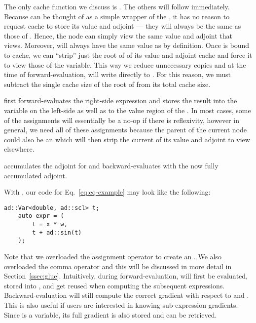 The only cache function we discuss is .
The others will follow immediately.
Because  can be thought of as a simple wrapper of the ,
it has no reason to request cache to store its value and adjoint --- 
they will always be the same as those of .
Hence, the node can simply view the same value and adjoint that  views.
Moreover,  will always have the same value as  by definition.
Once  is bound to cache, 
we can ``strip'' just the root of 
of its value and adjoint cache and force it to view those of the variable.
This way we reduce unnecessary copies and at the time of forward-evaluation,
 will write directly to .
For this reason, we must subtract the 
single cache size of the root of  from 
its total cache size.

 first forward-evaluates the right-side expression
and stores the result into the variable on the left-side
as well as to the value region of the .
In most cases, some of the assignments will essentially be a no-op
if there is reflexivity, however in general, we need all of these assignments
because the parent of the current node could also be an 
which will then strip the current  of its value and adjoint
to view elsewhere.

 accumulates the adjoint for 
and backward-evaluates  with the now fully accumulated adjoint.

With , our code for Eq.~\ref{eq:eq-example}
may look like the following:
\begin{lstlisting}[style=customcpp]
    ad::Var<double, ad::scl> t;
    auto expr = (
        t = x * w,
        t + ad::sin(t)
    );
\end{lstlisting}
Note that we overloaded the assignment operator to create an .
We also overloaded the comma operator
and this will be discussed in more detail in Section~\ref{ssec:glue}.
Intuitively, during forward-evaluation,  will first be evaluated,
stored into , and get reused when computing the subsequent expressions.
Backward-evaluation will still compute the correct gradient with respect to  and .
This is also useful if users are interested in knowing sub-expression gradients.
Since  is a variable, its full gradient is also stored and can be retrieved.
